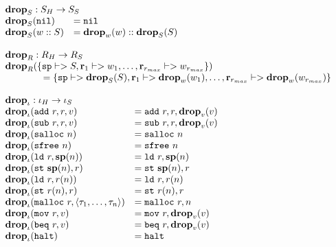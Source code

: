 {\[\begin{array}{l}
\begin{array}{ll}
\rlap{$\drop{S} : \high S -> \simple{S}$} \\
\drop{S}(\mathtt{nil}) &= \mathtt{nil} \\
\drop{S}(w :: S) &= \drop{w}(w) :: \drop{S}(S) \\
\end{array} \\\\

\begin{array}{l}
\drop{R} : \high R -> \simple{R} \\
\drop{R}(\{\mathtt{sp} |-> S, \mathbf{r}_1 |-> w_1, \dots, \mathbf{r}_{r_{max}} |-> w_{r_{max}}\})\\
\quad\quad\quad\quad = \{\mathtt{sp} |-> \drop{S}(S), \mathbf{r}_1 |-> \drop{w}(w_1), \dots, \mathbf{r}_{r_{max}} |-> \drop{w}(w_{r_{max}})\}
\end{array} \\\\

\begin{array}{ll}
\rlap{$\drop{\iota} : \high\iota -> \simple\iota$} \\
\drop{\iota}(\mathtt{add}\ r, r, v) &= \mathtt{add}\ r, r, \drop{v}(v) \\
\drop{\iota}(\mathtt{sub}\ r, r, v) &= \mathtt{sub}\ r, r, \drop{v}(v) \\
\drop{\iota}(\mathtt{salloc}\ n) &= \mathtt{salloc}\ n \\
\drop{\iota}(\mathtt{sfree}\ n) &= \mathtt{sfree}\ n \\
\drop{\iota}(\mathtt{ld}\ r, \mathbf{sp}(n)) &= \mathtt{ld}\ r, \mathbf{sp}(n) \\
\drop{\iota}(\mathtt{st}\ \mathbf{sp}(n), r) &= \mathtt{st}\ \mathbf{sp}(n), r \\
\drop{\iota}(\mathtt{ld}\ r, r(n)) &= \mathtt{ld}\ r, r(n) \\
\drop{\iota}(\mathtt{st}\ r(n), r) &= \mathtt{st}\ r(n), r \\
\drop{\iota}(\mathtt{malloc}\ r, \langle \tau_1, \dots, \tau_n \rangle) &= \mathtt{malloc}\ r, n \\
\drop{\iota}(\mathtt{mov}\ r, v) &= \mathtt{mov}\ r, \drop{v}(v) \\
\drop{\iota}(\mathtt{beq}\ r, v) &= \mathtt{beq}\ r, \drop{v}(v) \\
\drop{\iota}(\mathtt{halt}) &= \mathtt{halt} \\
\end{array} \\\\


\end{array}\]}

